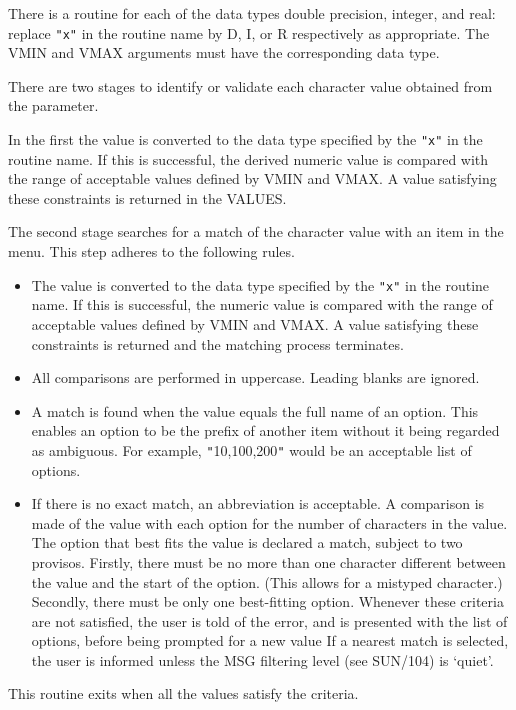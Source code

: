 \documentclass[twoside,11pt]{article}
\newcommand{\xref}[3]{#1}
\newcommand{\latex}[1]{#1}
\newcommand{\sstitem}{\item}
\begin{document}
{{{         \sstitem
         There is a routine for each of the data types double precision,
         integer, and real: replace {\tt "x"} in the routine name by D, I, or R
         respectively as appropriate.  The VMIN and VMAX arguments must
         have the corresponding data type.

         \sstitem
         There are two stages to identify or validate each character
         value obtained from the parameter.

      In the first the value is converted to the data type specified by
      the {\tt "x"} in the routine name.  If this is successful, the derived
      numeric value is compared with the range of acceptable values
      defined by VMIN and VMAX.  A value satisfying these constraints
      is returned in the VALUES.

      The second stage searches for a match of the character value with
      an item in the menu.  This step adheres to the following rules.
         \begin{itemize}
         \item  The value is converted to the data type specified by the
         {\tt "x"} in the routine name.  If this is successful, the numeric
         value is compared with the range of acceptable values defined
         by VMIN and VMAX.  A value satisfying these constraints is
         returned and the matching process terminates.
         \item  All comparisons are performed in uppercase.  Leading blanks
         are ignored.
         \item  A match is found when the value equals the full name of an
         option.  This enables an option to be the prefix of another
         item without it being regarded as ambiguous.  For example,
         {\tt "}10,100,200{\tt "} would be an acceptable list of options.
         \item If there is no exact match, an abbreviation is acceptable.
         A comparison is made of the value with each option for the
         number of characters in the value.  The option that best fits
         the value is declared a match, subject to two provisos.
         Firstly, there must be no more than one character different
         between the value and the start of the option.  (This allows
         for a mistyped character.)  Secondly, there must be only one
         best-fitting option.  Whenever these criteria are not
         satisfied, the user is told of the error, and is presented
         with the list of options, before being prompted for a new value
         If a nearest match is selected, the user is informed unless the
\xref{MSG filtering level}{sun104}{conditional_message_reporting}
\latex{ (see SUN/104)} is `quiet'.
         \end{itemize}

      This routine exits when all the values satisfy the criteria.
      }
   }
}
\end{document}
